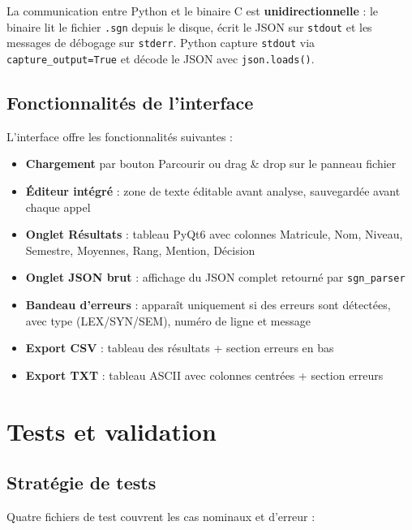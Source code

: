 \documentclass[10pt,a4paper]{article}
\begin{document}
La communication entre Python et le binaire C est \textbf{unidirectionnelle} :
le binaire lit le fichier \texttt{.sgn} depuis le disque, écrit le JSON sur
\texttt{stdout} et les messages de débogage sur \texttt{stderr}. Python capture
\texttt{stdout} via \texttt{capture\_output=True} et décode le JSON avec
\texttt{json.loads()}.

\subsection{Fonctionnalités de l'interface}

L'interface offre les fonctionnalités suivantes :

\begin{itemize}
  \item \textbf{Chargement} par bouton Parcourir ou drag \& drop sur le panneau fichier
  \item \textbf{Éditeur intégré} : zone de texte éditable avant analyse, sauvegardée avant chaque appel
  \item \textbf{Onglet Résultats} : tableau PyQt6 avec colonnes Matricule, Nom, Niveau, Semestre, Moyennes, Rang, Mention, Décision
  \item \textbf{Onglet JSON brut} : affichage du JSON complet retourné par \texttt{sgn\_parser}
  \item \textbf{Bandeau d'erreurs} : apparaît uniquement si des erreurs sont détectées, avec type (LEX/SYN/SEM), numéro de ligne et message
  \item \textbf{Export CSV} : tableau des résultats + section erreurs en bas
  \item \textbf{Export TXT} : tableau ASCII avec colonnes centrées + section erreurs
\end{itemize}

\section{Tests et validation}

\subsection{Stratégie de tests}

Quatre fichiers de test couvrent les cas nominaux et d'erreur :
\end{document}
